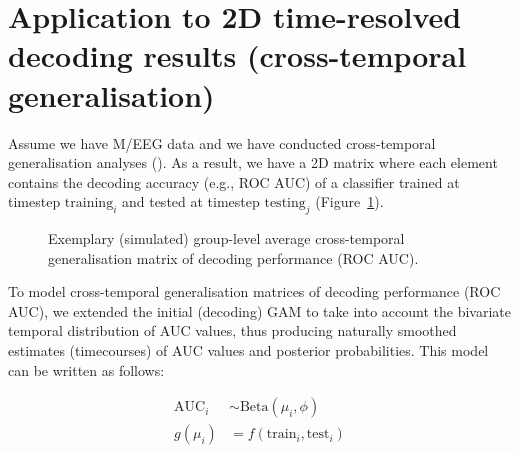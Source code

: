\documentclass[
  doc,
  floatsintext,
  longtable,
  a4paper,
  nolmodern,
  notxfonts,
  notimes,
  donotrepeattitle,
  colorlinks=true,linkcolor=blue,citecolor=blue,urlcolor=blue]{apa7}
\begin{document}
\newpage

\appendix

\section{Application to 2D time-resolved decoding results
(cross-temporal generalisation)}\label{sec-2D}

Assume we have M/EEG data and we have conducted cross-temporal
generalisation analyses (). As a result, we have a 2D matrix where each element contains the
decoding accuracy (e.g., ROC AUC) of a classifier trained at timestep
\(\text{training}_{i}\) and tested at timestep \(\text{testing}_{j}\)
(Figure~\ref{fig-sim-timegen}).

\begin{figure}[!htb]

\caption{\label{fig-sim-timegen}Exemplary (simulated) group-level
average cross-temporal generalisation matrix of decoding performance
(ROC AUC).}


\end{figure}%

To model cross-temporal generalisation matrices of decoding performance
(ROC AUC), we extended the initial (decoding) GAM to take into account
the bivariate temporal distribution of AUC values, thus producing
naturally smoothed estimates (timecourses) of AUC values and posterior
probabilities. This model can be written as follows:

\[
\begin{aligned}
\text{AUC}_{i} &\sim \mathrm{Beta}(\mu_{i}, \phi)\\
g(\mu_{i}) &= f \left(\text{train}_{i}, \text{test}_{i} \right)\\
\end{aligned}
\]
\end{document}

